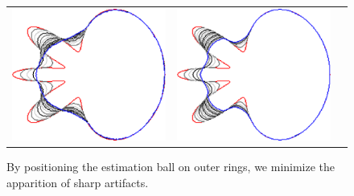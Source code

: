 \begin{figure}
\begin{tabular}{ccc}
\includegraphics[scale=0.22]{figures/chapter6/level-effect/flower/improve/len_pen0/radius-5/level4/summary.pdf} &
\includegraphics[scale=0.22]{figures/chapter6/level-effect/flower/improve/len_pen0/radius-5/level5/summary.pdf} 
\end{tabular}
\caption{ By positioning the estimation ball on outer rings, we minimize the apparition of sharp artifacts. %
}
\label{ch6:fig:mrings-r5-evolution}
\end{figure}


